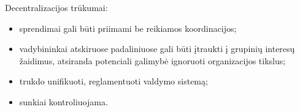 Decentralizacijos trūkumai:
\begin{itemize}
  \item sprendimai gali būti priimami be reikiamos koordinacijos;
  \item vadybininkai atskiruose padaliniuose gali būti įtraukti į
    grupinių interesų žaidimus, atsiranda potenciali galimybė
    ignoruoti organizacijos tikslus;
  \item trukdo unifikuoti, reglamentuoti valdymo sistemą;
  \item sunkiai kontroliuojama.
\end{itemize}
